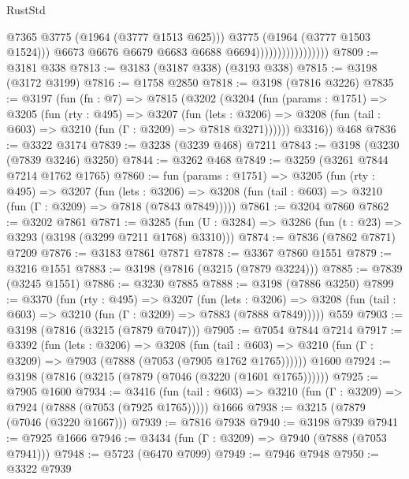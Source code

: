 \begin{lexlean}{RustStd}
\begin{coremodule}
                                          @7365
                                          @3775
                                          (@1964 (@3777 @1513 @625)))
                                        @3775
                                        (@1964 (@3777 @1503 @1524)))
                                      @6673
                                      @6676
                                      @6679
                                      @6683
                                      @6688
                                      @6694)))))))))))))))))
@7809 := @3181 @338
@7813 := @3183 (@3187 @338) (@3193 @338)
@7815 := @3198 (@3172 @3199)
@7816 := @1758 @2850
@7818 := @3198 (@7816 @3226)
@7835 := @3197
    (fun (fn : @7) =>
    @7815
      (@3202
        (@3204
          (fun (params : @1751) =>
          @3205
            (fun (rty : @495) =>
            @3207
              (fun (lets : @3206) =>
              @3208 (fun (tail : @603) => @3210 (fun (Γ : @3209) => @7818 @3271))))))
        @3316))
    @468
@7836 := @3322 @3174
@7839 := @3238 (@3239 @468) @7211
@7843 := @3198 (@3230 (@7839 @3246) @3250)
@7844 := @3262 @468
@7849 := @3259 (@3261 @7844 @7214 @1762 @1765)
@7860 := fun (params : @1751) =>
  @3205
    (fun (rty : @495) =>
    @3207
      (fun (lets : @3206) =>
      @3208 (fun (tail : @603) => @3210 (fun (Γ : @3209) => @7818 (@7843 @7849)))))
@7861 := @3204 @7860
@7862 := @3202 @7861
@7871 := @3285 (fun (U : @3284) => @3286 (fun (t : @23) => @3293 (@3198 (@3299 @7211 @1768) @3310)))
@7874 := @7836 (@7862 @7871) @7209
@7876 := @3183 @7861 @7871
@7878 := @3367 @7860 @1551
@7879 := @3216 @1551
@7883 := @3198 (@7816 (@3215 (@7879 @3224)))
@7885 := @7839 (@3245 @1551)
@7886 := @3230 @7885
@7888 := @3198 (@7886 @3250)
@7899 := @3370
    (fun (rty : @495) =>
    @3207
      (fun (lets : @3206) =>
      @3208 (fun (tail : @603) => @3210 (fun (Γ : @3209) => @7883 (@7888 @7849)))))
    @559
@7903 := @3198 (@7816 (@3215 (@7879 @7047)))
@7905 := @7054 @7844 @7214
@7917 := @3392
    (fun (lets : @3206) =>
    @3208
      (fun (tail : @603) => @3210 (fun (Γ : @3209) => @7903 (@7888 (@7053 (@7905 @1762 @1765))))))
    @1600
@7924 := @3198 (@7816 (@3215 (@7879 (@7046 (@3220 (@1601 @1765))))))
@7925 := @7905 @1600
@7934 := @3416
    (fun (tail : @603) => @3210 (fun (Γ : @3209) => @7924 (@7888 (@7053 (@7925 @1765)))))
    @1666
@7938 := @3215 (@7879 (@7046 (@3220 @1667)))
@7939 := @7816 @7938
@7940 := @3198 @7939
@7941 := @7925 @1666
@7946 := @3434 (fun (Γ : @3209) => @7940 (@7888 (@7053 @7941)))
@7948 := @5723 (@6470 @7099)
@7949 := @7946 @7948
@7950 := @3322 @7939

\end{coremodule}
\end{lexlean}
